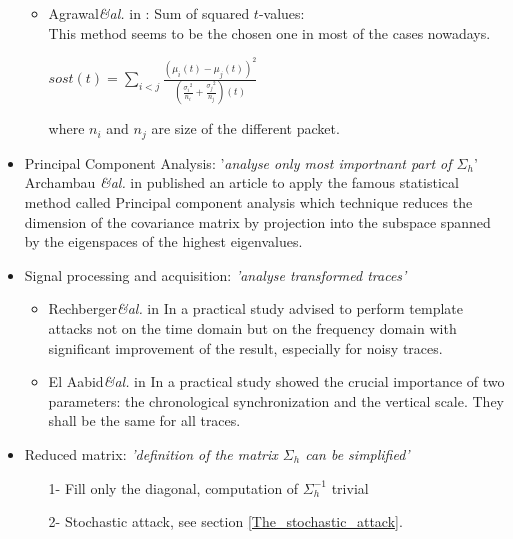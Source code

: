 \begin{itemize}
\begin{itemize}
		\item Agrawal\textit{\&al.} in 	: 
		Sum of squared $t$-values:\\
		This method seems to be the chosen one in most of the cases nowadays. 
		\begin{center}
		$sost(t) =  \sum \limits_{ i < j } 
		\frac{
 		 ( \mu_i(t)-\mu_j(t) )^2	}{
 		 (  \frac{ {\sigma_i}^2 }{n_i} + \frac{ {\sigma_j}^2 }{n_j} )(t) } $
		\end{center}
		where $n_i$ and $n_j$ are size of the different packet.
	\end{itemize}

	\item Principal Component Analysis: 
	'\textit{analyse only most importnant part of $\Sigma_h$}'\\
	Archambau \textit{\&al.} in 
	published an article to apply the famous statistical method called 
	Principal component analysis which technique reduces the dimension of the 
	covariance matrix by projection into the subspace spanned by the eigenspaces
	of the highest eigenvalues.


	\item Signal processing and acquisition: 
	\textit{'analyse transformed traces'}
	\begin{itemize}
		\item  Rechberger\textit{\&al.} in  
		In a practical study advised to perform template attacks not on the time 
		domain but on the frequency domain with significant improvement of the 
		result, especially for noisy traces.	
	
		\item  El Aabid\textit{\&al.} in 
		 In a practical study showed 
		the crucial importance of two parameters: the chronological synchronization
		and the vertical scale. They shall be the same for all traces.	
	\end{itemize}

	\item Reduced matrix:
	\textit{'definition of the matrix $\Sigma_h$ can be simplified'}
	\begin{itemize}
		\item[1-]  Fill only the diagonal, computation of $\Sigma_h^{-1}$ trivial	
		\item[2-]  Stochastic attack, see section \ref{The_stochastic_attack}.		
	\end{itemize}
\end{itemize}

